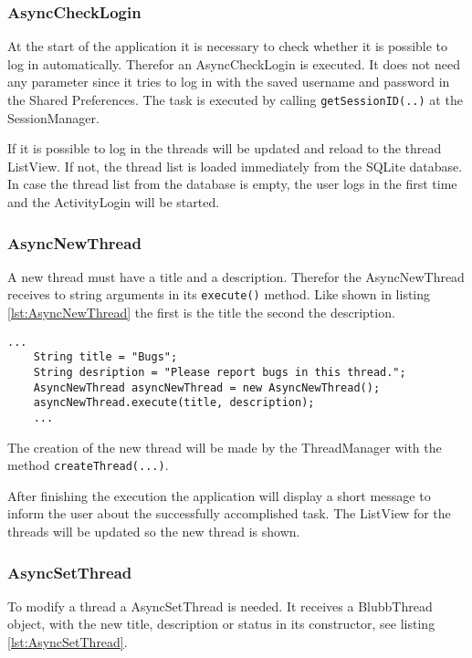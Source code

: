 \documentclass[12pt,a4paper,oneside]{report}
\newcommand{\code}[1]{\lstinline{#1}}
\begin{document}
\subsubsection{AsyncCheckLogin}
\label{AsyncCheckLogin}

At the start of the application it is necessary to check whether it is possible to log in automatically.
Therefor an AsyncCheckLogin is executed. It does not need any parameter since it tries to log in with the saved username and password in the Shared Preferences. 
The task is executed by calling \code{getSessionID(..)} at the SessionManager.


If it is possible to log in the threads will be updated and reload to the thread ListView. If not, the thread list is loaded immediately from the SQLite database. In case the thread list from the database is empty, the user logs in the first time and the ActivityLogin will be started.

\subsubsection{AsyncNewThread}
\label{subsubsec:AsyncNewThread}
A new thread must have a title and a description. Therefor the AsyncNewThread receives to string arguments in its \code{execute()} method. Like shown in listing \ref{lst:AsyncNewThread} the first is the title the second the description. 
\lstset{language=java}
\begin{lstlisting}[caption=AsyncNewThread example, label=lst:AsyncNewThread]
	...
	String title = "Bugs";
	String desription = "Please report bugs in this thread.";
	AsyncNewThread asyncNewThread = new AsyncNewThread();
	asyncNewThread.execute(title, description);
	...
\end{lstlisting}
The creation of the new thread will be made by the ThreadManager with the method \code{createThread(...)}.


After finishing the execution the application will display a short message to inform the user about the successfully accomplished task. The ListView for the threads will be updated so the new thread is shown.

\subsubsection{AsyncSetThread}
\label{subsubsec:AsyncSetThread}
To modify a thread a AsyncSetThread is needed. It receives a BlubbThread object, with the new title, description or status in its constructor, see listing \ref{lst:AsyncSetThread}.
\end{document}
